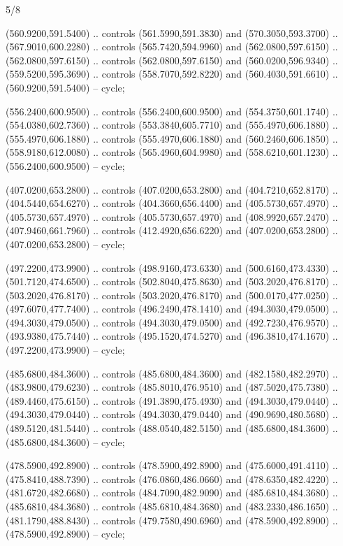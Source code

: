 \begin{flagdescription}{5/8}
\begin{scope}[shift={(m)}]
\begin{scope}[scale=\flagwidth/220,y=0.1mm, x=0.1mm, yscale=-1,shift={(-596,-360)}]
\begin{scope}[cm={{-1.0,0.0,0.0,1.0,(1193.9797,0.0)}}]
\begin{scope}[draw=black,line join=round,line cap=round,line width=0.381\lw]
\begin{scope}[fill=gold]
 (560.9200,591.5400) .. controls (561.5990,591.3830) and
  (570.3050,593.3700) .. (567.9010,600.2280) .. controls (565.7420,594.9960) and
  (562.0800,597.6150) .. (562.0800,597.6150) .. controls (562.0800,597.6150) and
  (560.0200,596.9340) .. (559.5200,595.3690) .. controls (558.7070,592.8220) and
  (560.4030,591.6610) .. (560.9200,591.5400) -- cycle;

 (556.2400,600.9500) .. controls (556.2400,600.9500) and
  (554.3750,601.1740) .. (554.0380,602.7360) .. controls (553.3840,605.7710) and
  (555.4970,606.1880) .. (555.4970,606.1880) .. controls (555.4970,606.1880) and
  (560.2460,606.1850) .. (558.9180,612.0080) .. controls (565.4960,604.9980) and
  (558.6210,601.1230) .. (556.2400,600.9500) -- cycle;

 (407.0200,653.2800) .. controls (407.0200,653.2800) and
  (404.7210,652.8170) .. (404.5440,654.6270) .. controls (404.3660,656.4400) and
  (405.5730,657.4970) .. (405.5730,657.4970) .. controls (405.5730,657.4970) and
  (408.9920,657.2470) .. (407.9460,661.7960) .. controls (412.4920,656.6220) and
  (407.0200,653.2800) .. (407.0200,653.2800) -- cycle;

\end{scope}
\begin{scope}[fill=olive]
 (497.2200,473.9900) .. controls (498.9160,473.6330) and
  (500.6160,473.4330) .. (501.7120,474.6500) .. controls (502.8040,475.8630) and
  (503.2020,476.8170) .. (503.2020,476.8170) .. controls (503.2020,476.8170) and
  (500.0170,477.0250) .. (497.6070,477.7400) .. controls (496.2490,478.1410) and
  (494.3030,479.0500) .. (494.3030,479.0500) .. controls (494.3030,479.0500) and
  (492.7230,476.9570) .. (493.9380,475.7440) .. controls (495.1520,474.5270) and
  (496.3810,474.1670) .. (497.2200,473.9900) -- cycle;

 (485.6800,484.3600) .. controls (485.6800,484.3600) and
  (482.1580,482.2970) .. (483.9800,479.6230) .. controls (485.8010,476.9510) and
  (487.5020,475.7380) .. (489.4460,475.6150) .. controls (491.3890,475.4930) and
  (494.3030,479.0440) .. (494.3030,479.0440) .. controls (494.3030,479.0440) and
  (490.9690,480.5680) .. (489.5120,481.5440) .. controls (488.0540,482.5150) and
  (485.6800,484.3600) .. (485.6800,484.3600) -- cycle;

 (478.5900,492.8900) .. controls (478.5900,492.8900) and
  (475.6000,491.4110) .. (475.8410,488.7390) .. controls (476.0860,486.0660) and
  (478.6350,482.4220) .. (481.6720,482.6680) .. controls (484.7090,482.9090) and
  (485.6810,484.3680) .. (485.6810,484.3680) .. controls (485.6810,484.3680) and
  (483.2330,486.1650) .. (481.1790,488.8430) .. controls (479.7580,490.6960) and
  (478.5900,492.8900) .. (478.5900,492.8900) -- cycle;


\end{scope}
\end{scope}
\end{scope}
\end{scope}
\end{scope}
\end{flagdescription}
